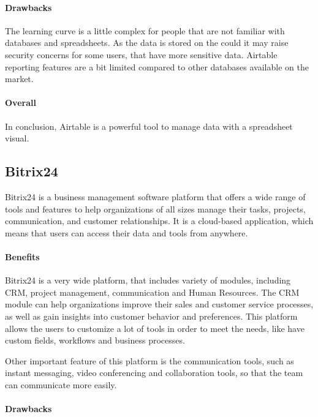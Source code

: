 \documentclass{article}
\begin{document}
\paragraph{Drawbacks}

The learning curve is a little complex for people that are not familiar with databases and spreadsheets. As the data is stored on the could it may raise security concerns for some users, that have more sensitive data. Airtable reporting features are a bit limited compared to other databases available on the market.

\paragraph{Overall}

In conclusion, Airtable is a powerful tool to manage data with a spreadsheet visual.

\subsection{Bitrix24}

Bitrix24 is a business management software platform that offers a wide range of tools and features to help organizations of all sizes manage their tasks, projects, communication, and customer relationships. It is a cloud-based application, which means that users can access their data and tools from anywhere.

\paragraph{Benefits}

Bitrix24 is a very wide platform, that includes variety of modules, including CRM, project management, communication and Human Resources. The CRM module can help organizations improve their sales and customer service processes, as well as gain insights into customer behavior and preferences. This platform allows the users to customize a lot of tools in order to meet the needs, like have custom fields, workflows and business processes.

Other important feature of this platform is the communication tools, such as instant messaging, video conferencing and collaboration tools, so that the team can communicate more easily.

\paragraph{Drawbacks}
\end{document}
